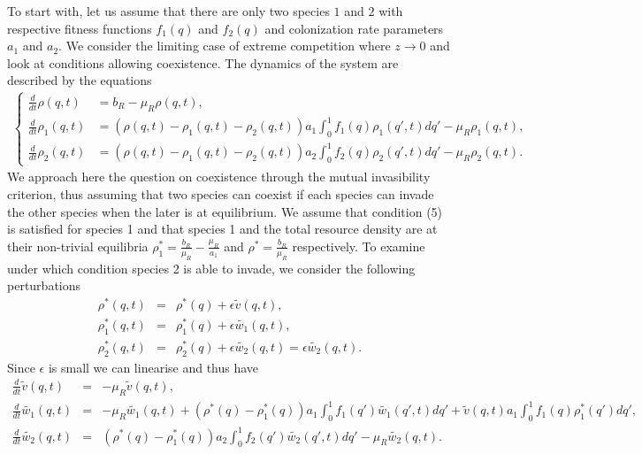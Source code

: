 \documentclass[8pt,a4paper]{article}
\begin{document}
To start with, let us assume that there are only two species $1$ and $2$ with respective fitness functions $f_1(q)$ and $f_2(q)$ and colonization rate parameters $a_1$  and $a_2$. We consider the limiting case of extreme competition where $z \rightarrow 0$ and look at conditions allowing coexistence. 
The dynamics of the system are described by the equations
\begin{eqnarray*}
\begin{cases}
 \displaystyle{\frac{d}{dt}}\rho(q,t)&= b_R - \mu_R \rho(q,t),\\
 \displaystyle{\frac{d}{dt}}\rho_1(q,t)&=  (\rho(q,t)-\rho_1(q,t)-\rho_2(q,t)) a_1 \int_0^1 f_1(q) \rho_1(q',t)dq'- \mu_R \rho_1(q,t), \\
 \displaystyle{\frac{d}{dt}}\rho_2(q,t)&=  (\rho(q,t)-\rho_1(q,t)-\rho_2(q,t)) a_2 \int_0^1 f_2(q) \rho_2(q',t)dq'- \mu_R \rho_2(q,t).
 \end{cases}
\end{eqnarray*} 
We approach here the question on coexistence through the mutual invasibility criterion, thus assuming that two species can coexist if each species can invade the other species when the later is at equilibrium. We assume that condition (5) is satisfied for species 1 and that species 1 and the total resource density are at their non-trivial equilibria  $\displaystyle{\rho_1^* = \frac{b_R}{\mu_R}- \frac{\mu_R}{a_1}}$ and $\displaystyle{\rho^*= \frac{b_R}{\mu_R}}$ respectively. To examine under which condition species 2 is able to invade, we consider the following perturbations
\begin{eqnarray*}
 \rho^*(q,t)&= &\rho^*(q)+\epsilon \tilde{v}(q,t), \\
 \rho_1^*(q,t)&= &\rho_1^*(q)+\epsilon \tilde{w_1}(q,t), \\
 \rho_2^*(q,t)&= &\rho_2^*(q)+\epsilon \tilde{w_2}(q,t)=\epsilon \tilde{w_2}(q,t).
\end{eqnarray*} 
Since $\epsilon$  is small we can  linearise and thus have 
\begin{eqnarray*}
\frac{d}{dt} \tilde{v}(q,t) &=& - \mu_R \tilde{v}(q,t),\\
\frac{d}{d t} \tilde{w_1}(q,t) &=& - \mu_R \tilde{w_1} (q,t) +(\rho^*(q)-\rho_1^*(q))a_1 \int_0^1  f_1(q') \tilde{w_1}(q',t) dq' +  \tilde{v}(q,t) a_1  \int_0^1 f_1(q) \rho_1^*(q')dq',\\
\frac{d}{d t} \tilde{w_2}(q,t) &=& (\rho^*(q)-\rho_1^*(q)) a_2\int_0^1  f_2(q') \tilde{w_2}(q',t) dq' - \mu_R \tilde{w_2}(q,t).
\end{eqnarray*}
\end{document}
